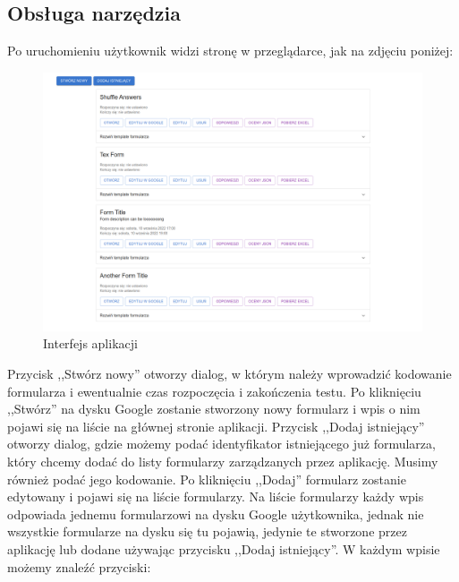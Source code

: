 \subsection{Obsługa narzędzia}
Po uruchomieniu użytkownik widzi stronę w przeglądarce, jak na zdjęciu poniżej:
\begin{figure}[H]
 \centering
  \includegraphics[scale=0.26]{strona.png}
  \caption{Interfejs aplikacji}
  \label{fig:1}
\end{figure}
Przycisk ,,Stwórz nowy'' otworzy dialog, w którym należy wprowadzić kodowanie 
formularza i ewentualnie czas rozpoczęcia i zakończenia testu. Po kliknięciu 
,,Stwórz'' na dysku Google zostanie stworzony nowy formularz i wpis o nim pojawi
się na liście na głównej stronie aplikacji. Przycisk ,,Dodaj istniejący'' otworzy
dialog, gdzie możemy podać identyfikator istniejącego już formularza, który chcemy
dodać do listy formularzy zarządzanych przez aplikację. Musimy również podać jego
kodowanie. Po kliknięciu ,,Dodaj'' formularz zostanie edytowany i pojawi się na 
liście formularzy. Na liście formularzy każdy wpis odpowiada jednemu formularzowi
na dysku Google użytkownika, jednak nie wszystkie formularze na dysku się tu pojawią,
jedynie te stworzone przez aplikację lub dodane używając przycisku ,,Dodaj istniejący''.
W każdym wpisie możemy znaleźć przyciski:
